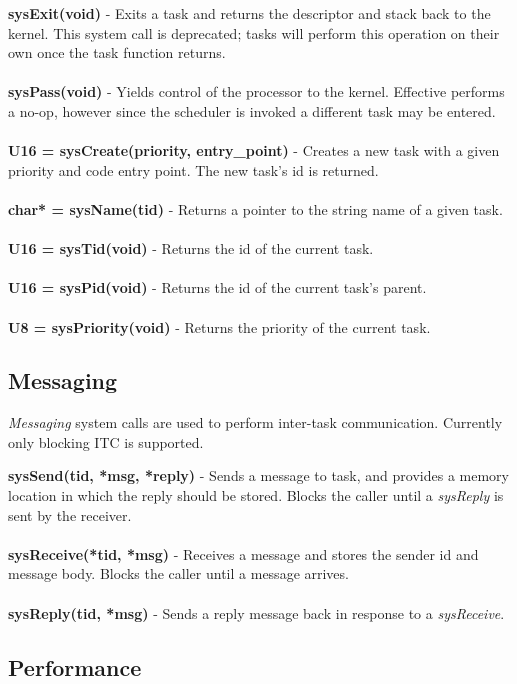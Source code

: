 \documentclass[twoside,a4paper]{refart}
\begin{document}
\textbf{sysExit(void)} - Exits a task and returns the descriptor and stack back to the kernel. This system call is deprecated; tasks will perform this operation on their own once the task function returns.\\\\
\textbf{sysPass(void)} - Yields control of the processor to the kernel. Effective performs a no-op, however since the scheduler is invoked a different task may be entered.\\\\
\textbf{U16 = sysCreate(priority, entry\_point)} - Creates a new task with a given priority and code entry point. The new task's id is returned.\\\\
\textbf{char* = sysName(tid)} - Returns a pointer to the string name of a given task.\\\\
\textbf{U16 = sysTid(void)} - Returns the id of the current task.\\\\
\textbf{U16 = sysPid(void)} - Returns the id of the current task's parent.\\\\
\textbf{U8 = sysPriority(void)} - Returns the priority of the current task.

\subsection{Messaging}

\textit{Messaging} system calls are used to perform inter-task communication. Currently only blocking ITC is supported.

\textbf{sysSend(tid, *msg, *reply)} - Sends a message to task, and provides a memory location in which the reply should be stored. Blocks the caller until a \textit{sysReply} is sent by the receiver.\\\\
\textbf{sysReceive(*tid, *msg)} - Receives a message and stores the sender id and message body. Blocks the caller until a message arrives.\\\\
\textbf{sysReply(tid, *msg)} - Sends a reply message back in response to a \textit{sysReceive}.

\subsection{Performance}
\end{document}
